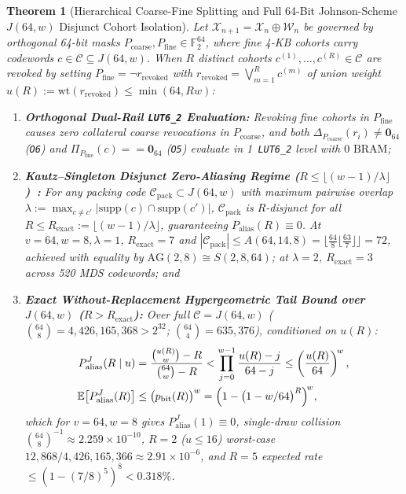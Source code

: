 \documentclass[11pt,letterpaper]{article}
\theoremstyle{spectralthm}
\newtheorem{theorem}{Theorem}[section]
\begin{document}
\begin{theorem}[Hierarchical Coarse-Fine Splitting and Full 64-Bit Johnson-Scheme $J(64,w)$ Disjunct Cohort Isolation]
\label{thm:johnson}
\label{thm:multiscale}
Let $\mathcal{X}_{n+1} = \mathcal{X}_n \oplus \mathcal{W}_n$ be governed by orthogonal 64-bit masks $P_{\mathrm{coarse}}, P_{\mathrm{fine}} \in \mathbb{F}_2^{64}$, where fine 4-KB cohorts carry codewords $c \in \mathcal{C} \subseteq J(64,w)$. When $R$ distinct cohorts $c^{(1)},\ldots,c^{(R)} \in \mathcal{C}$ are revoked by setting $P_{\mathrm{fine}} = \neg r_{\mathrm{revoked}}$ with $r_{\mathrm{revoked}} = \bigvee_{m=1}^R c^{(m)}$ of union weight $u(R) := \mathrm{wt}(r_{\mathrm{revoked}}) \le \min(64, Rw)$:
\begin{enumerate}
  \item[(i)] \textbf{Orthogonal Dual-Rail \texttt{LUT6\_2} Evaluation:} Revoking fine cohorts in $P_{\mathrm{fine}}$ causes zero collateral coarse revocations in $P_{\mathrm{coarse}}$, and both $\Delta_{P_{\mathrm{coarse}}}(r_i) \neq \mathbf{0}_{64}$ (\texttt{O6}) and $\Pi_{P_{\mathrm{fine}}}(c) == \mathbf{0}_{64}$ (\texttt{O5}) evaluate in 1~\mbox{\texttt{LUT6\_2}} level with $0\text{~BRAM}$;
  \item[(ii)] \textbf{Kautz--Singleton Disjunct Zero-Aliasing Regime ($R \le \lfloor (w-1)/\lambda \rfloor$)~\cite{kautz1964nonrandom}:} For any packing code $\mathcal{C}_{\mathrm{pack}} \subset J(64,w)$ with maximum pairwise overlap $\lambda := \max_{c \neq c'} |\mathrm{supp}(c) \cap \mathrm{supp}(c')|$, $\mathcal{C}_{\mathrm{pack}}$ is $R$-disjunct for all $R \le R_{\mathrm{exact}} := \lfloor (w-1)/\lambda \rfloor$, guaranteeing $P_{\mathrm{alias}}(R) \equiv 0$. At $v=64, w=8, \lambda=1$, $R_{\mathrm{exact}} = 7$ and $|\mathcal{C}_{\mathrm{pack}}| \le A(64,14,8) = \lfloor \frac{64}{8}\lfloor \frac{63}{7}\rfloor \rfloor = 72$, achieved with equality by $\mathrm{AG}(2,8) \cong S(2,8,64)$; at $\lambda = 2$, $R_{\mathrm{exact}} = 3$ across 520 MDS codewords; and
  \item[(iii)] \textbf{Exact Without-Replacement Hypergeometric Tail Bound over $J(64,w)$ ($R > R_{\mathrm{exact}}$):} Over full $\mathcal{C} = J(64,w)$ ($\binom{64}{8} = 4,426,165,368 > 2^{32}$; $\binom{64}{4} = 635,376$), conditioned on $u(R)$:
  \begin{equation}
  \label{eq:hypergeom}
  \begin{aligned}
  P_{\mathrm{alias}}^J(R \mid u) &= \frac{\binom{u(R)}{w} - R}{\binom{64}{w} - R}
  < \prod_{j=0}^{w-1} \frac{u(R)-j}{64-j} \le \left(\frac{u(R)}{64}\right)^{\!w},\\
  \mathbb{E}\bigl[P_{\mathrm{alias}}^J(R)\bigr] &\le \bigl(p_{\mathrm{bit}}(R)\bigr)^w
  = \Bigl(1 - \bigl(1 - w/64\bigr)^R\Bigr)^{\!w},
  \end{aligned}
  \end{equation}
  which for $v = 64, w = 8$ gives $P_{\mathrm{alias}}^J(1) \equiv 0$, single-draw collision $\binom{64}{8}^{-1} \approx 2.259 \times 10^{-10}$, $R = 2$ ($u \le 16$) worst-case $12,868 / 4,426,165,366 \approx 2.91 \times 10^{-6}$, and $R = 5$ expected rate $\le (1 - (7/8)^5)^8 < 0.318\%$.
\end{enumerate}
\end{theorem}
\end{document}
